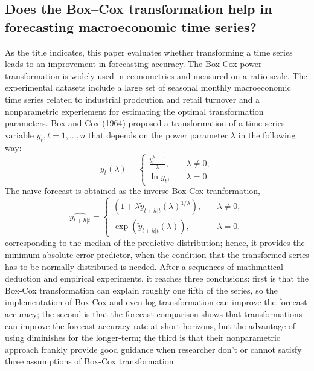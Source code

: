 \documentclass[12pt]{article}
\begin{document}
\subsection{Does the Box–Cox transformation help in forecasting macroeconomic time series? }
As the title indicates, this paper evaluates whether transforming a time series leads to an improvement in forecasting accuracy. The Box-Cox power transformation is widely used in econometrics and measured on a ratio scale. The experimental datasets include a large set of seasonal monthly macroeconomic time series related to industrial prodcution and retail turnover and a nonparametric experiement for estimating the optimal transformation parameters. Box and Cox (1964) proposed a transformation of a time series variable $y_t, t = 1, ..., n$ that depends on the power parameter $\lambda$ in the following way: 
$$
y_t(\lambda) = 
  \begin{cases}
    \frac{y_t^{\lambda} - 1}{\lambda}, &\quad \lambda \neq 0, \\ 
    \ln{y_t}, &\quad \lambda = 0. 
  \end{cases}
$$
The naïve forecast is obtained as the inverse Box-Cox tranformation, 
$$
\hat{y_{t+h|t}} = 
  \begin{cases}
    (1+\lambda \tilde{y}_{t+h|t}(\lambda)^{1/\lambda}), &\quad \lambda \neq 0, \\
    \exp(\tilde{y}_{t+h|t}(\lambda)), &\quad \lambda = 0. 
  \end{cases} 
$$
corresponding to the median of the predictive distribution; hence, it provides the minimum absolute error predictor, when the condition that the transformed series has to be normally distributed is needed. After a sequences of mathmatical deduction and empirical experiments, it reaches three conclusions: first is that the Box-Cox transformation can explain roughly one fifth of the series, so the implementation of Box-Cox and even log transformation can improve the forecast accuracy; the second is that the forecast comparison shows that transformations can improve the forecast accuracy rate at short horizons, but the advantage of using diminishes for the longer-term; the third is that their nonparametric approach frankly provide good guidance when researcher don't or cannot satisfy three assumptions of Box-Cox transformation. 
\end{document}
